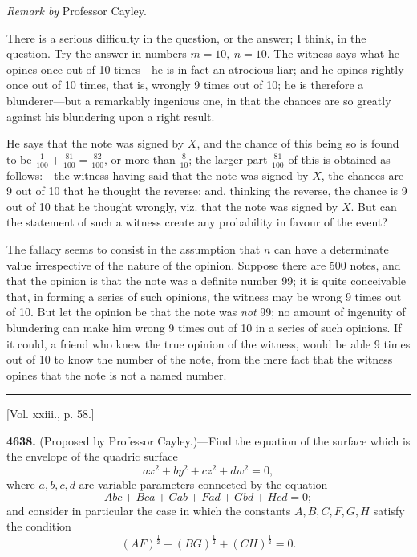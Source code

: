 \documentclass[10pt,twoside]{article}
\begin{document}
\newpage

\begin{center}
\textit{Remark by} Professor Cayley.
\end{center}

There is a serious difficulty in the question, or the answer; I think, in the
question. Try the answer in numbers \(m=10,\ n=10\). The witness says what he
opines once out of 10 times---he is in fact an atrocious liar; and he opines
rightly once out of 10 times, that is, wrongly 9 times out of 10; he is
therefore a blunderer---but a remarkably ingenious one, in that the chances are
so greatly against his blundering upon a right result.

He says that the note was signed by \(X\), and the chance of this being so is
found to be \(\frac1{100}+\frac{81}{100}=\frac{82}{100}\), or more than
\(\frac8{10}\); the larger part \(\frac{81}{100}\) of this is obtained as
follows:---the witness having said that the note was signed by \(X\), the
chances are 9 out of 10 that he thought the reverse; and, thinking the reverse,
the chance is 9 out of 10 that he thought wrongly, viz. that the note was signed
by \(X\). But can the statement of such a witness create any probability in
favour of the event?

The fallacy seems to consist in the assumption that \(n\) can have a determinate
value irrespective of the nature of the opinion. Suppose there are 500 notes,
and that the opinion is that the note was a definite number 99; it is quite
conceivable that, in forming a series of such opinions, the witness may be wrong
9 times out of 10. But let the opinion be that the note was \textit{not} 99; no
amount of ingenuity of blundering can make him wrong 9 times out of 10 in a
series of such opinions. If it could, a friend who knew the true opinion of the
witness, would be able 9 times out of 10 to know the number of the note, from
the mere fact that the witness opines that the note is not a named number.

\begin{center}
\rule{0.32\linewidth}{0.4pt}

[Vol. xxiii., p. 58.]
\end{center}

\noindent\textbf{4638.} (Proposed by Professor Cayley.)---Find the equation of
the surface which is the envelope of the quadric surface
\[
        ax^2+by^2+cz^2+dw^2=0,
\]
where \(a,b,c,d\) are variable parameters connected by the equation
\[
        Abc+Bca+Cab+Fad+Gbd+Hcd=0;
\]
and consider in particular the case in which the constants \(A,B,C,F,G,H\)
satisfy the condition
\[
        (AF)^{\frac12}+(BG)^{\frac12}+(CH)^{\frac12}=0.
\]
\end{document}
